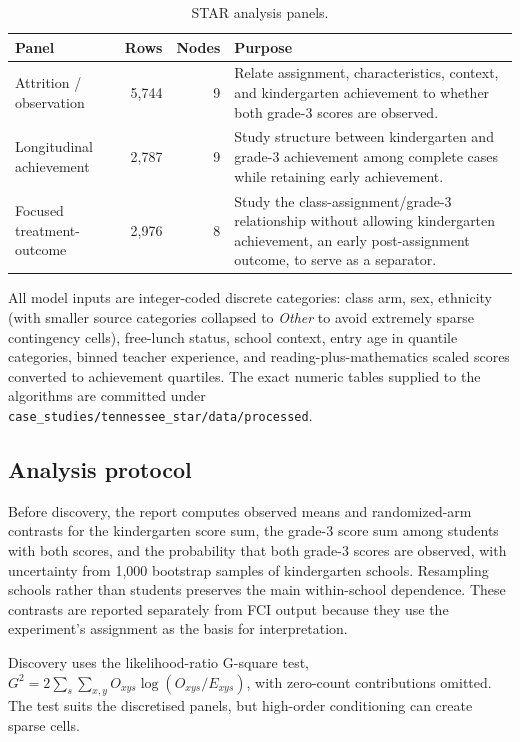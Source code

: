 \documentclass[11pt,a4paper]{article}
\newcommand{\code}[1]{\texttt{#1}}
\begin{document}
\begin{table}[H]
\caption{STAR analysis panels.}
\label{tab:panels}
\begin{tabularx}{\textwidth}{lrrY}
\toprule
Panel & Rows & Nodes & Purpose \\
\midrule
Attrition / observation & 5,744 & 9 &
Relate assignment, characteristics, context, and kindergarten achievement to
whether both grade-3 scores are observed. \\
Longitudinal achievement & 2,787 & 9 &
Study structure between kindergarten and grade-3 achievement among complete
cases while retaining early achievement. \\
Focused treatment-outcome & 2,976 & 8 &
Study the class-assignment/grade-3 relationship without allowing kindergarten
achievement, an early post-assignment outcome, to serve as a separator. \\
\bottomrule
\end{tabularx}
\end{table}

All model inputs are integer-coded discrete categories: class arm, sex,
ethnicity (with smaller source categories collapsed to \emph{Other} to avoid
extremely sparse contingency cells), free-lunch status, school context, entry
age in quantile categories, binned teacher experience, and reading-plus-mathematics
scaled scores converted to achievement quartiles. The exact numeric tables
supplied to the algorithms are committed under
\code{case\_studies/tennessee\_star/data/processed}.

\subsection{Analysis protocol}

Before discovery, the report computes observed means and randomized-arm
contrasts for the kindergarten score sum, the grade-3 score sum among students
with both scores, and the probability that both grade-3 scores are observed,
with uncertainty from 1,000 bootstrap samples of kindergarten schools.
Resampling schools rather than students preserves the main within-school
dependence. These contrasts are reported separately from FCI output because
they use the experiment's assignment as the basis for interpretation.

Discovery uses the likelihood-ratio G-square test,
\(G^2 = 2 \sum_s \sum_{x,y} O_{xys} \log ( O_{xys} / E_{xys} )\), with
zero-count contributions omitted. The test suits the discretised panels, but
high-order conditioning can create sparse cells.
\end{document}
